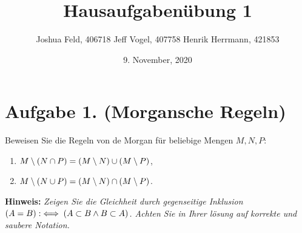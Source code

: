 \documentclass[german,12pt]{homework}
\title{Hausaufgabenübung 1}
\author{Joshua Feld, 406718 \quad Jeff Vogel, 407758 \quad Henrik Herrmann, 421853}
\date{9. November, 2020}
\institute{RWTH Aachen University\\Center for Computational Engineering Science}
\DeclarePairedDelimiter{\enbrace}{(}{)}
\begin{document}
    \maketitle

    \section*{Aufgabe 1. (Morgansche Regeln)}

    \begin{problem}
        Beweisen Sie die Regeln von de Morgan für beliebige Mengen \(M, N, P\):
        \begin{enumerate}
            \item \(M \setminus \enbrace*{N \cap P} = \enbrace*{M \setminus N}
            \cup \enbrace*{M \setminus P}\),
            \item \(M \setminus \enbrace*{N \cup P} = \enbrace*{M \setminus N}
            \cap \enbrace*{M \setminus P}\).
        \end{enumerate}

        \textbf{Hinweis:} \quad \emph{Zeigen Sie die Gleichheit durch
        gegenseitige Inklusion \(\enbrace*{A = B} :\iff \enbrace*{A \subset B
        \land B \subset A}\). Achten Sie in Ihrer lösung auf korrekte und
        saubere Notation.}
    \end{problem}
\end{document}
